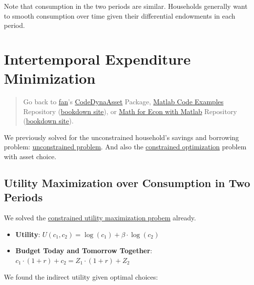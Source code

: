 \documentclass[
]{book}
\begin{document}
Note that consumption in the two periods are similar. Households
generally want to smooth consumption over time given their differential
endowments in each period.

\hypertarget{intertemporal-expenditure-minimization}{%
\section{Intertemporal Expenditure Minimization}\label{intertemporal-expenditure-minimization}}

\begin{quote}
Go back to \href{http://fanwangecon.github.io/}{fan}'s \href{https://fanwangecon.github.io/CodeDynaAsset/}{CodeDynaAsset} Package, \href{https://fanwangecon.github.io/M4Econ/}{Matlab Code Examples} Repository (\href{https://fanwangecon.github.io/M4Econ/bookdown}{bookdown site}), or \href{https://fanwangecon.github.io/Math4Econ/}{Math for Econ with Matlab} Repository (\href{https://fanwangecon.github.io/Math4Econ/bookdown}{bookdown site}).
\end{quote}

We previously solved for the unconstrained household's savings and
borrowing problem: \href{https://fanwangecon.github.io/Math4Econ/derivative_application/K_save_households.html}{unconstrained
problem}.
And also the \href{https://fanwangecon.github.io/Math4Econ/opti_hh_constrained_brsv/household_borrow_constrained.html}{constrained
optimization}
problem with asset choice.

\hypertarget{utility-maximization-over-consumption-in-two-periods-1}{%
\subsection{Utility Maximization over Consumption in Two Periods}\label{utility-maximization-over-consumption-in-two-periods-1}}

We solved the \href{https://fanwangecon.github.io/Math4Econ/opti_hh_constrained_brsv/household_c1_c2_constrained.html}{constrained utility maximization
probem}
already.

\begin{itemize}
\item
  \textbf{Utility}: \(U(c_1 ,c_2 )=\log (c_1 )+\beta \cdot \log (c_2 )\)
\item
  \textbf{Budget Today and Tomorrow Together}:
  \(c_1 \cdot (1+r)+c_2 =Z_1 \cdot (1+r)+Z_2\)
\end{itemize}

We found the indirect utility given optimal choices:
\end{document}
